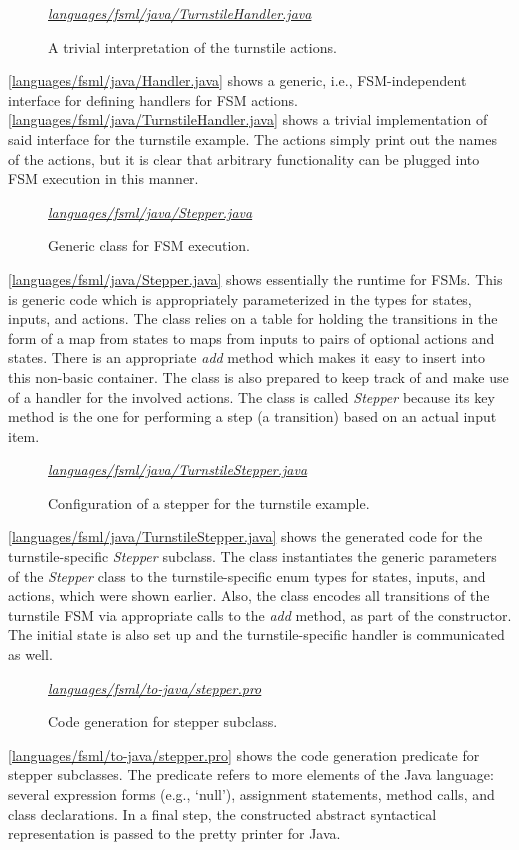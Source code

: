 \documentclass[preprint,authoryear,12pt]{noelsarticle}
\newcommand{\codefigure}[3]{
\begin{figure}[t!]
\begin{boxedminipage}{\hsize}
\mbox{}\hfill{}{\small\textit{\href{http://github.com/slebok/slepro/tree/master/#2}{#2}}}

\end{boxedminipage}
\caption{#1.}
\label{#2}
\medskip
\end{figure}}
\begin{document}
\codefigure{%
A trivial interpretation of the turnstile actions}{%
languages/fsml/java/TurnstileHandler.java}{%
java}

\autoref{languages/fsml/java/Handler.java} shows a generic, i.e.,
FSM-independent interface for defining handlers for FSM
actions. \autoref{languages/fsml/java/TurnstileHandler.java} shows a
trivial implementation of said interface for the turnstile
example. The actions simply print out the names of the actions, but it
is clear that arbitrary functionality can be plugged into FSM
execution in this manner. 

\codefigure{%
Generic class for FSM execution}{%
languages/fsml/java/Stepper.java}{%
java}

\autoref{languages/fsml/java/Stepper.java} shows essentially the
runtime for FSMs. This is generic code which is appropriately
parameterized in the types for states, inputs, and actions. The class
relies on a table for holding the transitions in the form of a map
from states to maps from inputs to pairs of optional actions and
states. There is an appropriate \emph{add} method which makes it easy
to insert into this non-basic container. The class is also prepared to
keep track of and make use of a handler for the involved actions. The
class is called \emph{Stepper} because its key method is the one for
performing a step (a transition) based on an actual input item.

\codefigure{%
Configuration of a stepper for the turnstile example}{%
languages/fsml/java/TurnstileStepper.java}{%
java}

\autoref{languages/fsml/java/TurnstileStepper.java} shows the
generated code for the turnstile-specific \emph{Stepper} subclass. The
class instantiates the generic parameters of the \emph{Stepper} class
to the turnstile-specific enum types for states, inputs, and actions,
which were shown earlier. Also, the class encodes all transitions of
the turnstile FSM via appropriate calls to the \emph{add} method, as
part of the constructor. The initial state is also set up and the
turnstile-specific handler is communicated as well.

\codefigure{%
Code generation for stepper subclass}{%
languages/fsml/to-java/stepper.pro}{%
prolog}

\autoref{languages/fsml/to-java/stepper.pro} shows the code generation
predicate for stepper subclasses. The predicate refers to more
elements of the Java language: several expression forms (e.g.,
`null'), assignment statements, method calls, and class
declarations. In a final step, the constructed abstract syntactical
representation is passed to the pretty printer for Java.
\end{document}
